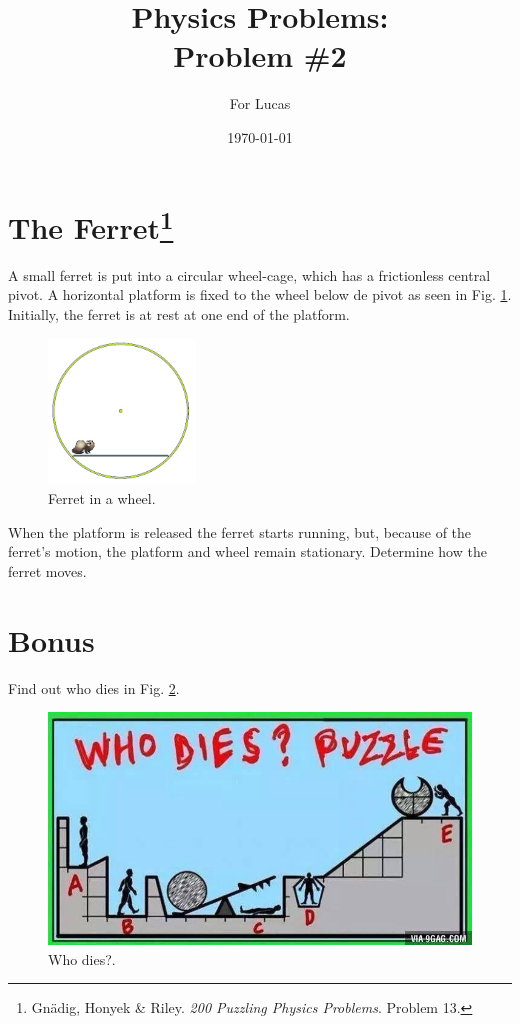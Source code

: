 \documentclass{article}
\begin{document}
\title{Physics Problems:\\ Problem \#2}

\author{For Lucas}

\date{\today}
\maketitle


\section*{The Ferret\footnote{Gn\"adig, Honyek \& Riley. \textit{200 Puzzling Physics Problems}. Problem 13. }}

A small ferret is put into a circular wheel-cage, which has a frictionless central pivot. A horizontal platform is fixed to the wheel below de pivot as seen in Fig. \ref{fig:ferret}. Initially, the ferret is at rest at one end of the platform. \\

\begin{figure}[h!]
\begin{center}
\includegraphics[width=0.35\textwidth]{ferret}
\end{center}
\caption{Ferret in a wheel.}
\label{fig:ferret}
\end{figure}

When the platform is released the ferret starts running, but, because of the ferret's motion, the platform and wheel remain stationary. Determine how the ferret moves.

\section*{Bonus}

Find out who dies in Fig. \ref{fig:whodies}.\\

\begin{figure}[h!]
\begin{center}
\includegraphics[width=1\textwidth]{whodies}
\end{center}
\caption{Who dies?.}
\label{fig:whodies}
\end{figure}
\end{document}
